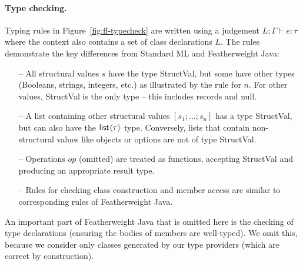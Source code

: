 \documentclass[10pt,preprint,clearpagebib]{sigplanconf}
\newcommand{\langl}{\begin{picture}(4.5,7)
\put(1.1,2.5){\rotatebox{60}{\line(1,0){5.5}}}
\put(1.1,2.5){\rotatebox{300}{\line(1,0){5.5}}}
\end{picture}}
\newcommand{\rangl}{\begin{picture}(4.5,7)
\put(.9,2.5){\rotatebox{120}{\line(1,0){5.5}}}
\put(.9,2.5){\rotatebox{240}{\line(1,0){5.5}}}
\end{picture}}
\newcommand{\kvd}[1]{\textnormal{\textcolor{kvdclr}{\sffamily #1}}}
\newcommand{\ident}[1]{\textnormal{\sffamily #1}}
\begin{document}
\paragraph{Type checking.} 
Typing rules in Figure~\ref{fig:ff-typecheck} are written using a judgement
$L; \Gamma \vdash e : \tau$ where the context also contains a set of class declarations $L$.
The rules demonstrate the key differences from Standard ML and Featherweight Java:
%
\begin{itemize}
\item[--] All structural values $s$ have the type \ident{StructVal}, but some have other types
  (Booleans, strings, integers, etc.) as illustrated by the rule for $n$.
  For other values, \ident{StructVal} is the only type -- this includes records and \kvd{null}.
\item[--] A list containing other structural values $[s_1; \ldots; s_n]$ has a type \ident{StructVal},
  but can also have the $\ident{list}\langl\tau\rangl$ type. Conversely, lists that contain
  non-structural values like objects or options are not of type \ident{StructVal}.
\item[--] Operations $op$ (omitted) are treated as functions, accepting 
  \ident{StructVal} and producing an appropriate result type.
\item[--] Rules for checking class construction and member access are similar to corresponding
  rules of Featherweight Java.  
\end{itemize}
%
An important part of Featherweight Java that is omitted here is the checking of type declarations
(ensuring the bodies of members are well-typed). We omit this, because we consider only classes 
generated by our type providers (which are correct by construction).

\end{document}
